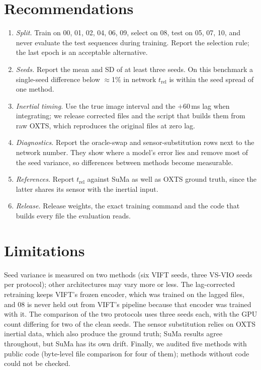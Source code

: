 \documentclass[letterpaper,journal]{IEEEtran}
\newcommand{\trel}{t_{\mathrm{rel}}}
\begin{document}
\section{Recommendations}
\label{sec:recs}

\begin{enumerate}
\item \emph{Split.} Train on 00, 01, 02, 04, 06, 09, select on 08, test on 05, 07, 10, and never evaluate the test sequences during training. Report the selection rule; the last epoch is an acceptable alternative.
\item \emph{Seeds.} Report the mean and SD of at least three seeds. On this benchmark a single-seed difference below $\approx$1\% in network $\trel$ is within the seed spread of one method.
\item \emph{Inertial timing.} Use the true image interval and the $+60$\,ms lag when integrating; we release corrected files and the script that builds them from raw OXTS, which reproduces the original files at zero lag.
\item \emph{Diagnostics.} Report the oracle-swap and sensor-substitution rows next to the network number. They show where a model's error lies and remove most of the seed variance, so differences between methods become measurable.
\item \emph{References.} Report $\trel$ against SuMa as well as OXTS ground truth, since the latter shares its sensor with the inertial input.
\item \emph{Release.} Release weights, the exact training command and the code that builds every file the evaluation reads.
\end{enumerate}

\section{Limitations}

Seed variance is measured on two methods (six VIFT seeds, three VS-VIO seeds per protocol); other architectures may vary more or less. The lag-corrected retraining keeps VIFT's frozen encoder, which was trained on the lagged files, and 08 is never held out from VIFT's pipeline because that encoder was trained with it. The comparison of the two protocols uses three seeds each, with the GPU count differing for two of the clean seeds. The sensor substitution relies on OXTS inertial data, which also produce the ground truth; SuMa results agree throughout, but SuMa has its own drift. Finally, we audited five methods with public code (byte-level file comparison for four of them); methods without code could not be checked.
\end{document}

